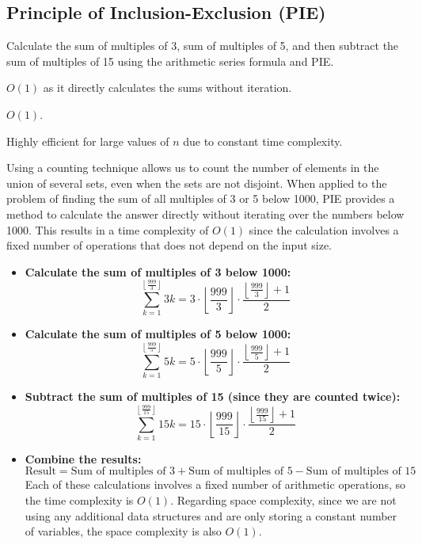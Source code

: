 \documentclass{article}
\begin{document}
\subsection*{Principle of Inclusion-Exclusion (PIE)}
\begin{description}[font=\normalfont,align=left]
    \item[Approach:] Calculate the sum of multiples of 3, sum of multiples of 5, and then subtract the sum of multiples of 15 using the arithmetic series formula and PIE.
    \item[Time Complexity:] \(O(1)\) as it directly calculates the sums without iteration.
    \item[Space Complexity:] \(O(1)\).
    \item[Pros:] Highly efficient for large values of \(n\) due to constant time complexity.
\end{description}
\newpage

Using a counting technique allows us to count the number of elements in the union of several sets, even when the sets are not disjoint. When applied to the problem of finding the sum of all multiples of 3 or 5 below 1000, PIE provides a method to calculate the answer directly without iterating over the numbers below 1000. This results in a time complexity of \(O(1)\) since the calculation involves a fixed number of operations that does not depend on the input size. 
\begin{itemize}
    \item \textbf{Calculate the sum of multiples of 3 below 1000:}
    \[
    \sum_{k=1}^{\left\lfloor\frac{999}{3}\right\rfloor} 3k = 3 \cdot \left\lfloor\frac{999}{3}\right\rfloor \cdot \frac{\left\lfloor\frac{999}{3}\right\rfloor + 1}{2}
    \]
    
    \item \textbf{Calculate the sum of multiples of 5 below 1000:}
    \[
    \sum_{k=1}^{\left\lfloor\frac{999}{5}\right\rfloor} 5k = 5 \cdot \left\lfloor\frac{999}{5}\right\rfloor \cdot \frac{\left\lfloor\frac{999}{5}\right\rfloor + 1}{2}
    \]
    
    \item \textbf{Subtract the sum of multiples of 15 (since they are counted twice):}
    \[
    \sum_{k=1}^{\left\lfloor\frac{999}{15}\right\rfloor} 15k = 15 \cdot \left\lfloor\frac{999}{15}\right\rfloor \cdot \frac{\left\lfloor\frac{999}{15}\right\rfloor + 1}{2}
    \]
    
    \item \textbf{Combine the results:}
    \[
    \text{Result} = \text{Sum of multiples of 3} + \text{Sum of multiples of 5} - \text{Sum of multiples of 15}
    \]
    Each of these calculations involves a fixed number of arithmetic operations, so the time complexity is \(O(1)\). Regarding space complexity, since we are not using any additional data structures and are only storing a constant number of variables, the space complexity is also \(O(1)\).
\end{itemize}
\end{document}
